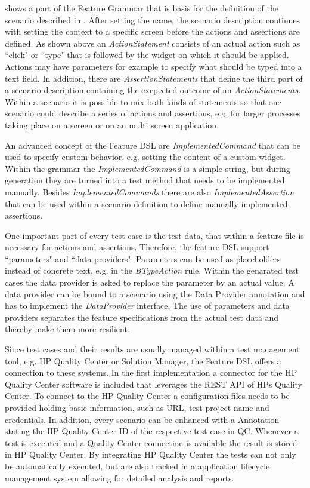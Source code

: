 \documentclass{sig-alternate-05-2015}
\begin{document}
 shows a part of the Feature Grammar that is basis for the definition of the scenario described in .
After setting the name, the scenario description continues with setting the context to a specific screen before the actions and assertions are defined.
As shown above an \textit{ActionStatement} consists of an actual action such as ``click" or ``type" that is followed by the widget on which it should be applied.
Actions may have parameters for example to specify what should be typed into a text field. 
In addition, there are \textit{AssertionStatements} that define the third part of a scenario description containing the excpected outcome of an \textit{ActionStatements}.
Within a scenario it is possible to mix both kinds of statements so that one scenario could describe a series of actions and assertions, e.g. for larger processes taking place on a screen or on an multi screen application.   

An advanced concept of the Feature DSL are \textit{ImplementedCommand} that can be used to specify custom behavior, e.g. setting the content of a custom widget.
Within the grammar the \textit{ImplementedCommand} is a simple string, but during generation they are turned into a test method that needs to be implemented manually. 
Besides \textit{ImplementedCommands} there are also  \textit{ImplementedAssertion} that can be used within a scenario definition to define manually implemented assertions.

One important part of every test case is the test data, that within a feature file is necessary for actions and assertions.
Therefore, the feature DSL support ``parameters" and ``data providers".
Parameters can be used as placeholders instead of concrete text, e.g. in the \textit{BTypeAction} rule.
Within the genarated test cases the data provider is asked to replace the parameter by an actual value.
A data provider can be bound to a scenario using the Data Provider annotation and has to implement the \textit{DataProvider} interface.
The use of parameters and data providers separates the feature specifications from the actual test data and thereby make them more resilient.

Since test cases and their results are usually managed within a test management tool, e.g. HP Quality Center or Solution Manager, the Feature DSL offers a connection to these systems.
In the first implementation a connector for the HP Quality Center software is included that leverages the REST API of HPs Quality Center.
To connect to the HP Quality Center a configuration files needs to be provided holding basic information, such as URL, test project name and credentials.
In addition, every scenario can be enhanced with a Annotation stating the HP Quality Center ID of the respective test case in QC.
Whenever a test is executed and a Quality Center connection is available the result is stored in HP Quality Center.
By integrating HP Quality Center the tests can not only be automatically executed, but are also tracked in a application lifecycle management system allowing for detailed analysis and reports.
\end{document}

